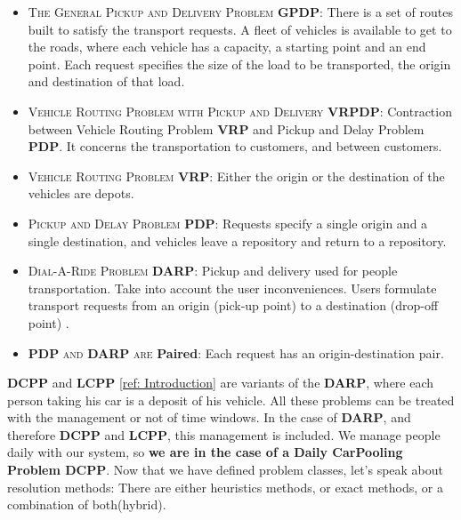 \documentclass[12pt, a4paper,twoside]{memoir}
\newcommand{\newpar}{\vskip 0.2in \noindent}
\newcommand\tab[1][1cm]{\hspace*{#1}}
\begin{document}
	\begin{itemize}
		\item \textsc{The General Pickup and Delivery Problem} \textbf{GPDP}: \newline
		\tab There is a set of routes built to satisfy the transport requests. \newline
		\tab A fleet of vehicles is available to get to the roads, where each vehicle has a capacity, a starting point and an end point. \newline
		\tab Each request specifies the size of the load to be transported, the origin and destination of that load. 
		\item \textsc{Vehicle Routing Problem with Pickup and Delivery} \textbf{VRPDP}: \newline
		\tab Contraction between Vehicle Routing Problem \textbf{VRP} and Pickup and Delay Problem \textbf{PDP}.\newline
		\tab It concerns the transportation to customers, and between customers. 
		\item \textsc{Vehicle Routing Problem} \textbf{VRP}: \newline
		\tab Either the origin or the destination of the vehicles are depots.
		\item \textsc{Pickup and Delay Problem} \textbf{PDP}: \newline
		\tab Requests specify a single origin and a single destination, and vehicles leave a repository and return to a repository. 
		\item \textsc{Dial-A-Ride Problem} \textbf{DARP}: \newline
		\tab Pickup and delivery used for people transportation. \newline
		\tab Take into account the user inconveniences.\newline
		\tab Users formulate transport requests from an origin (pick-up point) to a destination (drop-off point) \cite{yanoptimization2011}. 
		\item \textbf{PDP}\textsc{ and} \textbf{DARP} \textsc{are} \textbf{Paired}: \newline
		\tab Each request has an origin-destination pair.
	\end{itemize}
	\textbf{DCPP} and \textbf{LCPP} \hyperref[sec:The kinds of carpooling]{[ref: Introduction]} are variants of the \textbf{DARP}, where each person taking his car is a deposit of his vehicle.
	\newpar
	All these problems can be treated with the management or not of time windows. In the case of \textbf{DARP}, and therefore \textbf{DCPP} and \textbf{LCPP}, this management is included. \newline
	We manage people daily with our system, so \textbf{we are in the case of a Daily CarPooling Problem DCPP}.
	\newpar
	Now that we have defined problem classes, let's speak about resolution methods: There are either heuristics methods, or exact methods, or a combination of both(hybrid).
	
\end{document}
